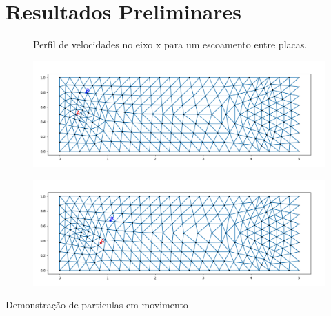 \documentclass{beamer}
\begin{document}
\section{Resultados Preliminares}

\begin{frame}
  \begin{figure}
     {\raggedleft \tiny Perfil de velocidades no eixo x para um escoamento entre placas.}
  \end{figure}
  
  \begin{minipage}{.49\textwidth}
    \begin{figure}
      \includegraphics[width=\linewidth]{figure/particles_results_0.png}
    \end{figure}
  \end{minipage}
  \begin{minipage}{.49\textwidth}
    \begin{figure}
      \includegraphics[width=\linewidth]{figure/particles_results_1.png}
    \end{figure}
  \end{minipage}
  
  \tiny{Demonstração de particulas em movimento}
\end{frame}
\end{document}
